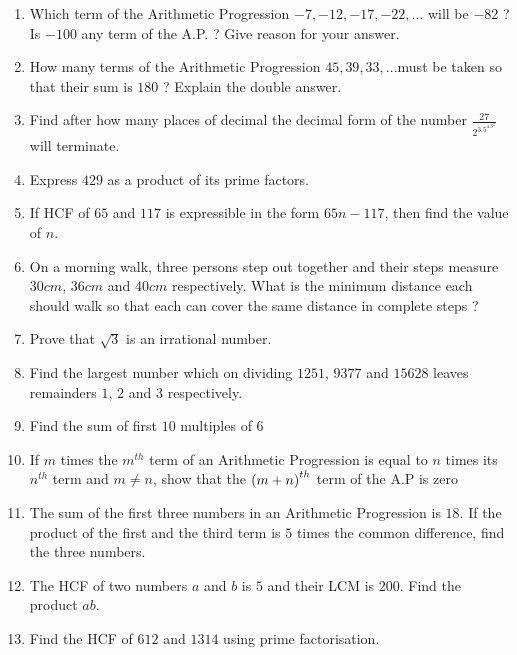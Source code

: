 \begin{enumerate}
\item Which term of the Arithmetic Progression $-7, -12, -17, -22, ... $ will be $-82$ ? Is $-100$ any term of the A.P. ? Give reason for your answer.

\item How many terms of the Arithmetic Progression $45, 39, 33, ... $must be taken so that their sum is $180$ ? Explain the double answer.

\item Find after how many places of decimal the decimal form of the number $\frac {27}{2^3.5^4.3^2}$ will terminate.

\item Express $429$ as a product of its prime factors.

\item If HCF of $65$ and $117$ is expressible in the form $65n - 117$, then find the value of $n$.

\item On a morning walk, three persons step out together and their steps measure $30 cm$, $36 cm$ and $40 cm$ respectively. What is the minimum distance each should walk so that each can cover the same distance in complete steps ?

\item Prove that $\sqrt{3}$ is an irrational number.

\item Find the largest number which on dividing $1251$, $9377$ and $15628$ leaves remainders $1$, $2$ and $3$ respectively.

\item Find the sum of first $10$ multiples of $6$

\item If $m$ times the $m^{th}$ term of an Arithmetic Progression is equal to $n$ times
its $n^{th}$ term and $m \neq n$, show that the $\left(m + n\right)^{th}$ term of the A.P is zero

\item The sum of the first three numbers in an Arithmetic Progression is $18$. If the product of the first and the third term is $5$ times the common
difference, find the three numbers.

\item The HCF of two numbers $a$ and $b$ is $5$ and their LCM is $200 $. Find the product $ab$.

\item Find the HCF of $612$ and $1314$ using prime factorisation.


\end{enumerate}
